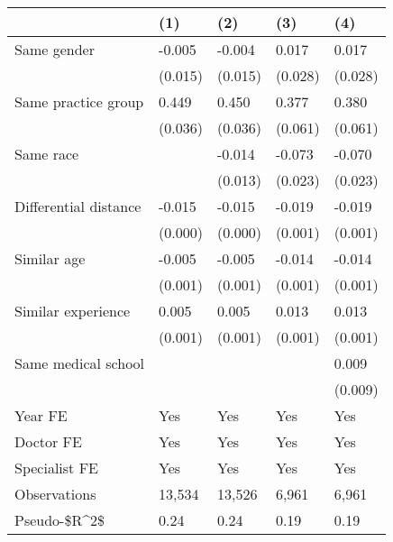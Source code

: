 \begin{tabular}{lllll}
\hline
& (1) & (2) & (3) & (4) \\ \hline
Same gender                        & -0.005  & -0.004  & 0.017   & 0.017   \\
& (0.015) & (0.015) & (0.028) & (0.028) \\
Same practice group                & 0.449   & 0.450   & 0.377   & 0.380   \\
& (0.036) & (0.036) & (0.061) & (0.061) \\
Same race                          &         & -0.014  & -0.073  & -0.070  \\
&         & (0.013) & (0.023) & (0.023) \\
Differential distance              & -0.015  & -0.015  & -0.019  & -0.019  \\
& (0.000) & (0.000) & (0.001) & (0.001) \\
Similar age                        & -0.005  & -0.005  & -0.014  & -0.014  \\
& (0.001) & (0.001) & (0.001) & (0.001) \\
Similar experience                 & 0.005   & 0.005   & 0.013   & 0.013   \\
& (0.001) & (0.001) & (0.001) & (0.001) \\
Same medical school                &         &         &         & 0.009   \\
&         &         &         & (0.009) \\
Year FE                            & Yes     & Yes     & Yes     & Yes     \\
Doctor FE                          & Yes     & Yes     & Yes     & Yes     \\
Specialist FE                      & Yes     & Yes     & Yes     & Yes     \\
Observations                       & 13,534  & 13,526  & 6,961   & 6,961   \\
Pseudo-\$R\textasciicircum{}2\$ & 0.24    & 0.24    & 0.19    & 0.19    \\
\hline
\end{tabular}

